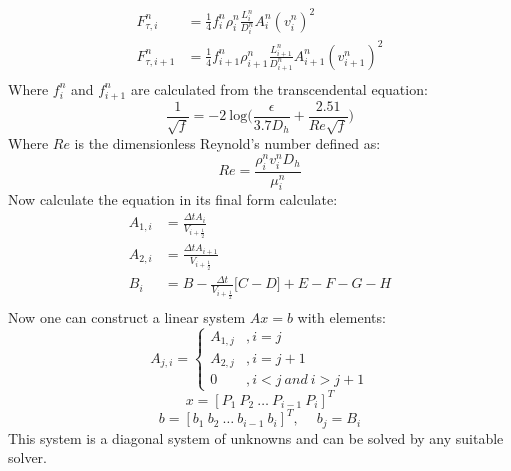 \documentclass[11pt,letterpaper,titlepage]{article}
\newcommand{\half}{\frac{1}{2}}
\begin{document}
\begin{equation*}
\begin{aligned}
F_{\tau,i}^n&=\frac{1}{4} f_i^n \rho_i^n \frac{L_i^n}{D_i^n}A_i^n (v_i^n)^2 \\
F_{\tau,i+1}^n&=\frac{1}{4} f_{i+1}^n \rho_{i+1}^n \frac{L_{i+1}^n}{D_{i+1}^n}A_{i+1}^n (v_{i+1}^n)^2 \\
\end{aligned}
\end{equation*}
\newline
Where $f_{i}^n$ and $f_{i+1}^n$ are calculated from the transcendental equation:
\begin{equation*}
\frac{1}{\sqrt{f}}=-2 \ \mathrm{log} \biggr ( \frac{\epsilon}{3.7 D_h}+\frac{2.51}{Re \sqrt{f}}    \biggr)
\end{equation*}
\newline
Where $Re$ is the dimensionless Reynold's number defined as:
\begin{equation*}
Re=\frac{\rho_i^n v_i^n D_h}{\mu_i^n}
\end{equation*}
\newline
Now calculate the equation in its final form calculate:
\begin{equation*}
\begin{aligned}
A_{1,i}&=\frac{\Delta t A_{i}}{V_{i+\half}} \\
A_{2,i}&=\frac{\Delta t A_{i+1}}{V_{i+\half}} \\
B_{i}&=B - \frac{\Delta t}{V_{i+\half}} \biggr[   C - D \biggr] +E -F-G-H\\
\end{aligned}
\end{equation*}
\newline
Now one can construct a linear system $Ax=b$ with elements:
\begin{equation*}
A_{j,i}=
\begin{cases}
A_{1,j}                  &, i=j \\
A_{2,j}                  &, i=j+1 \\
0                   &, i<j \ and \ i>j+1
\end{cases}
\end{equation*}
\begin{equation*}
x=[P_1 \ P_2 \ \dots \ P_{i-1} \ P_i]^T
\end{equation*}
\begin{equation*}
b=[b_1 \ b_2 \ \dots \ b_{i-1} \ b_i]^T, \quad \ b_j=B_i
\end{equation*}
\newline
This system is a diagonal system of unknowns and can be solved by any suitable solver.
\end{document}
